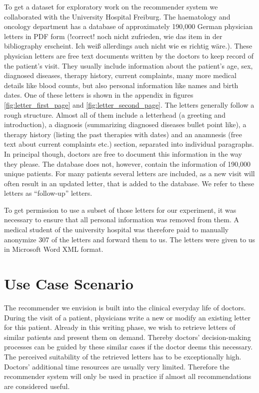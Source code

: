 To get a dataset for exploratory work on the recommender system we collaborated with the University Hospital Freiburg. The haematology and oncology department has a database of approximately 190,000 German
physician letters in PDF form \citep{spadaro2012} (!correct! noch nicht zufrieden, wie das item in der bibliography erscheint. Ich weiß allerdings auch nicht wie es richtig wäre.). These physician letters are free text documents
written by the doctors to keep record of the patient's visit. They
usually include information about the patient's age, sex, diagnosed
diseases, therapy history, current complaints, many more medical details
like blood counts, but also personal information like names and birth dates. One of these letters is shown in the appendix in figures \ref{fig:letter_first_page} and \ref{fig:letter_second_page}.
The letters generally follow a rough structure. Almost all of them include a letterhead (a greeting and introduction), a diagnosis (summarizing diagnosed diseases bullet point like), a therapy history (listing the past therapies with dates) and an anamnesis (free text about current complaints etc.) section, separated into individual paragraphs. In principal though, doctors are free to document this information in the way they please. The database does not, however, contain the information of 190,000 unique patients. For many patients several letters are included, as a new visit will often result in an updated letter, that is added to the database. We refer to these letters as ``follow-up'' letters.

To get permission to use a subset of those letters for our experiment, it was necessary to ensure that all personal information was removed from them. A medical student of the university hospital was therefore paid to manually anonymize 307 of the letters and forward them to us. The letters were given to us in Microsoft Word XML format.

\section{Use Case Scenario}
The recommender we envision is built into the clinical everyday life of doctors. During the visit of a patient, physicians write a new or modify an existing letter for this patient. Already in this writing phase, we wish to retrieve letters of similar patients and present them on demand. Thereby doctors' decision-making processes can be guided by these similar cases if the doctor deems this necessary. The perceived suitability of the retrieved letters has to be exceptionally high. Doctors' additional time resources are usually very limited. Therefore the recommender system will only be used in practice if almost all recommendations are considered useful.

